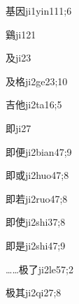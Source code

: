 \begin{verbete}{基因}{ji1yin1}{11;6}
\end{verbete}

\begin{verbete}{鷄}{ji1}{21}
\end{verbete}

\begin{verbete}{及}{ji2}{3}
\end{verbete}

\begin{verbete}{及格}{ji2ge2}{3;10}
\end{verbete}

\begin{verbete}{吉他}{ji2ta1}{6;5}
\end{verbete}

\begin{verbete}{即}{ji2}{7}
\end{verbete}

\begin{verbete}{即便}{ji2bian4}{7;9}
\end{verbete}

\begin{verbete}{即或}{ji2huo4}{7;8}
\end{verbete}

\begin{verbete}{即若}{ji2ruo4}{7;8}
\end{verbete}

\begin{verbete}{即使}{ji2shi3}{7;8}
\end{verbete}

\begin{verbete}{即是}{ji2shi4}{7;9}
\end{verbete}

\begin{verbete}{……极了}{ji2le5}{7;2}
\end{verbete}

\begin{verbete}{极其}{ji2qi2}{7;8}
\end{verbete}

